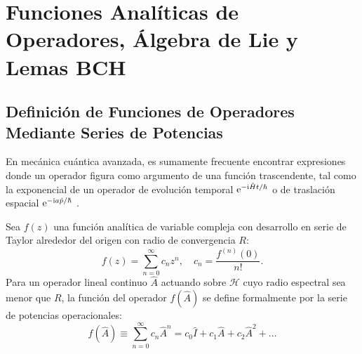 
\section{Funciones Analíticas de Operadores, Álgebra de Lie y Lemas BCH}
\label{sec:funciones_operadores}

\subsection{Definición de Funciones de Operadores Mediante Series de Potencias}

En mecánica cuántica avanzada, es sumamente frecuente encontrar expresiones donde un operador figura como argumento de una función trascendente, tal como la exponencial de un operador de evolución temporal $\mathrm{e}^{-\mathrm{i}\hat{H}t/\hbar}$ o de traslación espacial $\mathrm{e}^{-\mathrm{i} a\hat{p}/\hbar}$ \cite{dirac, sakurai}.

\begin{teoremabox}
    Sea $f(z)$ una función analítica de variable compleja con desarrollo en serie de Taylor alrededor del origen con radio de convergencia $R$:
    \begin{equation}
        f(z) = \sum_{n=0}^\infty c_n z^n, \quad c_n = \frac{f^{(n)}(0)}{n!}.
    \end{equation}
    Para un operador lineal continuo $\hat{A}$ actuando sobre $\mathcal{H}$ cuyo radio espectral sea menor que $R$, la función del operador $f(\hat{A})$ se define formalmente por la serie de potencias operacionales:
    \begin{equation}
        f(\hat{A}) \equiv \sum_{n=0}^\infty c_n \hat{A}^n = c_0 \hat{I} + c_1 \hat{A} + c_2 \hat{A}^2 + \dots
        \label{eq:operator_function_def}
    \end{equation}
\end{teoremabox}

